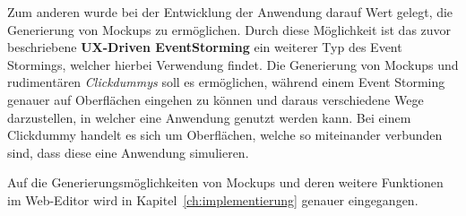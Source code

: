 Zum anderen wurde bei der Entwicklung der Anwendung darauf Wert gelegt, die Generierung von Mockups zu ermöglichen.
Durch diese Möglichkeit ist das zuvor beschriebene \textbf{UX-Driven EventStorming} ein weiterer Typ des Event Stormings, welcher hierbei Verwendung findet.
Die Generierung von Mockups und rudimentären \textit{Clickdummys} soll es ermöglichen, während einem Event Storming genauer auf Oberflächen eingehen zu können
und daraus verschiedene Wege darzustellen, in welcher eine Anwendung genutzt werden kann.
Bei einem Clickdummy handelt es sich um Oberflächen, welche so miteinander verbunden sind, dass diese eine Anwendung simulieren.

Auf die Generierungsmöglichkeiten von Mockups und deren weitere Funktionen im Web-Editor wird in Kapitel~\ref{ch:implementierung} genauer eingegangen.

